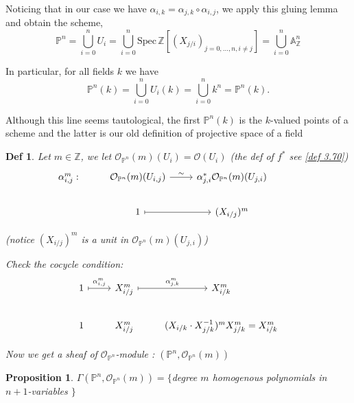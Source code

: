 \documentclass{article}
\newtheorem{definition}[theorem]{Def}
\newtheorem{proposition}[theorem]{Proposition}
\begin{document}
Noticing that in our case we have $\alpha_{i,k} = \alpha_{j,k} \circ \alpha_{i,j}$, we apply this gluing lemma and obtain the scheme,
$$
\mathbb{P}^{n}=\bigcup_{i=0}^{n}U_{i}=\bigcup_{i=0}^{n}{\mathrm{Spec}}\,\mathbb{Z}[(X_{j/i})_{j=0,\ldots,n,i\neq j}]=\bigcup_{i=0}^{n}\mathbb A_{\mathbb{Z}}^{n}
$$

In particular, for all fields $k$  we have
$$
\mathbb{P}^{n}(k)={{{\bigcup_{i=0}^{n}U_{i}(k)}}}={{{\bigcup_{i=0}^{n}k^{n}=\mathbb{P}^{n}(k)}}}. 
$$

Although this line seems tautological, the first $\mathbb{P}^{n}(k)$ is the $k$-valued points of a scheme and the latter is our old definition of projective space of a field

\begin{definition}
    Let $m\in\mathbb Z$, we let $\mathcal O_{\mathbb P^n}(m)(U_i)=\mathcal O(U_i)$ (the def of $f^\ast$ see \ref{def 3.70})
\[\begin{tikzcd}
	{\alpha_{i,j}^m:     } & {\mathcal O_{\mathbb P^n}(m)(U_{i,j})} & {\alpha_{j,i}^\ast\mathcal  O_{\mathbb P^n}(m)(U_{j,i})} & {} \\
	& 1 & {(X_{i/j})^m}
	\arrow["\sim", from=1-2, to=1-3]
	\arrow[maps to, from=2-2, to=2-3]
\end{tikzcd}\]

(notice $(X_{i/j})^m$ is a unit in $\mathcal  O_{\mathbb P^n}(m)(U_{j,i})$)

Check the cocycle condition:
\[\begin{tikzcd}
	{1    } & {X_{i/j}^m} & {X_{i/k}^m} \\
	1 & {X_{i/j}^m} & {(X_{i/k}\cdot X_{j/k}^{-1})^m X_{j/k}^m=X_{i/k}^m}
	\arrow["{\alpha_{j,k}^m}", maps to, from=1-2, to=1-3]
	\arrow["{\alpha_{i,j}^m}", maps to, from=1-1, to=1-2]
\end{tikzcd}\]

Now we get a sheaf of 
$\mathcal O_{\mathbb P^n}$-module : \boldmath$(\mathbb P^n,\mathcal O_{\mathbb P^n}(m))$
\end{definition}

\begin{proposition}
    $\Gamma(\mathbb P^n,\mathcal O_{\mathbb P^n}(m))=\{$degree $m$ homogenous polynomials in $n+1$-variables $\}$
\end{proposition}
\end{document}
